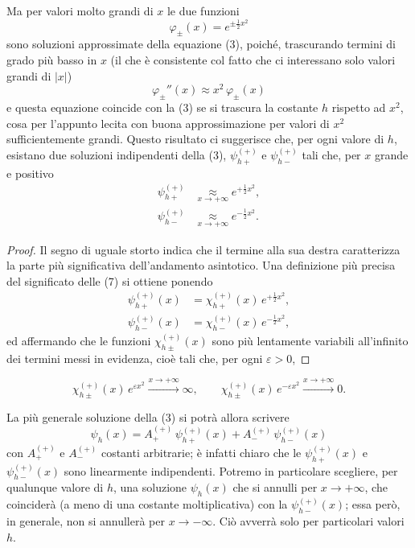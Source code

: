 \documentclass[11pt, a4paper]{book}
\numberwithin{equation}{section}
\begin{document}
Ma per valori molto grandi di $x$ le due funzioni
\begin{equation}
\varphi_\pm(x) = e^{\pm\frac{1}{2}x^2}
\end{equation}
sono soluzioni approssimate della equazione (3), poiché, trascurando
termini di grado più basso in $x$ (il che è consistente col fatto che ci
interessano solo valori grandi di $|x|$)
\begin{equation}
\varphi_\pm''(x) \approx x^2\,\varphi_\pm(x)
\end{equation}
e questa equazione coincide con la (3) se si trascura la costante $h$
rispetto ad $x^2$, cosa per l'appunto lecita con buona approssimazione
per valori di $x^2$ sufficientemente grandi. Questo risultato ci
suggerisce che, per ogni valore di $h$, esistano due soluzioni
indipendenti della (3), $\psi_{h+}^{(+)}$ e $\psi_{h-}^{(+)}$ tali che,
per $x$ grande e positivo
\begin{align}
\psi_{h+}^{(+)} &\underset{x\to+\infty}{\approx} e^{+\frac{1}{2}x^2}, \tag{7a} \\
\psi_{h-}^{(+)} &\underset{x\to+\infty}{\approx} e^{-\frac{1}{2}x^2}. \tag{7b}
\end{align}

\begin{proof}
Il segno di uguale storto indica che il termine alla sua destra
caratterizza la parte più significativa dell'andamento asintotico. Una
definizione più precisa del significato delle (7) si ottiene ponendo
\begin{align*}
\psi_{h+}^{(+)}(x) &= \chi_{h+}^{(+)}(x)\,e^{+\frac{1}{2}x^2}, \\
\psi_{h-}^{(+)}(x) &= \chi_{h-}^{(+)}(x)\,e^{-\frac{1}{2}x^2},
\end{align*}
ed affermando che le funzioni $\chi_{h\pm}^{(+)}(x)$ sono più lentamente
variabili all'infinito dei termini messi in evidenza, cioè tali che, per
ogni $\varepsilon > 0$,
\end{proof}


\[
\chi_{h\pm}^{(+)}(x)\,e^{\varepsilon x^2}
  \xrightarrow{x\to+\infty} \infty,
\qquad
\chi_{h\pm}^{(+)}(x)\,e^{-\varepsilon x^2}
  \xrightarrow{x\to+\infty} 0.
\]

La più generale soluzione della (3) si potrà allora scrivere
\begin{equation}
\psi_h(x) = A_+^{(+)}\,\psi_{h+}^{(+)}(x) + A_-^{(+)}\,\psi_{h-}^{(+)}(x)
\end{equation}
con $A_+^{(+)}$ e $A_-^{(+)}$ costanti arbitrarie; è infatti chiaro che le
$\psi_{h+}^{(+)}(x)$ e $\psi_{h-}^{(+)}(x)$ sono linearmente indipendenti.
Potremo in particolare scegliere, per qualunque valore di $h$, una soluzione
$\psi_h(x)$ che si annulli per $x \to +\infty$, che coinciderà (a meno di
una costante moltiplicativa) con la $\psi_{h-}^{(+)}(x)$; essa però, in
generale, non si annullerà per $x \to -\infty$. Ciò avverrà solo per
particolari valori $h$.
\end{document}
